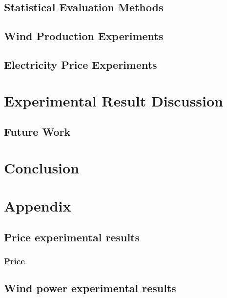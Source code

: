\documentclass[twoside,11pt,openright]{report}
\begin{document}
\section{Statistical Evaluation Methods}
\label{sec:statisticalEvaluation}

\newpage
\section{Wind Production Experiments}
\label{sec:windProductionExperiments}

\newpage
\section{Electricity Price Experiments}
\label{sec:priceExperiments}

\newpage




\chapter{Experimental Result Discussion}
\label{ch:experimentalResultDiscussions}

\newpage

\newpage
\section{Future Work}




\chapter{Conclusion}
\label{ch:conclusion}



 



\chapter{Appendix}
\label{ch:appendix}
\section{Price experimental results}
\subsection{Price}
\label{sec:priceResultAppendix}
 
\section{Wind power experimental results}
\label{sec:windResultsAppendix}
 	
\end{document}
